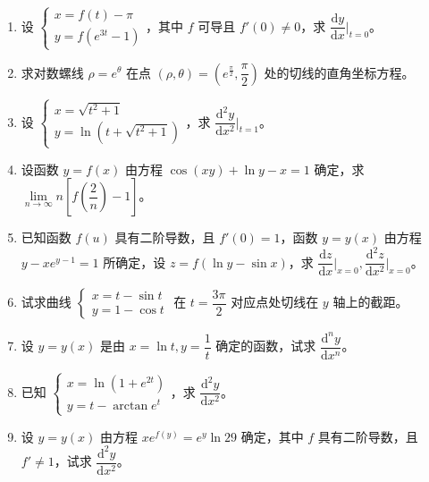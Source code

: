 \begin{enumerate}[label=\textbf{\arabic*.}, itemsep=5cm]
    \item 设 $\begin{cases} x = f(t) - \pi \\ y = f(e^{3t} - 1) \end{cases}$，其中 $f$ 可导且 $f'(0) \neq 0$，求 $\dfrac{\mathrm{d} y}{\mathrm{d} x} \bigg|_{t=0}$。

    \item 求对数螺线 $\rho = e^\theta$ 在点 $(\rho, \theta) = \left( e^{\frac{\pi}{2}}, \dfrac{\pi}{2} \right)$ 处的切线的直角坐标方程。

    \item 设 $\begin{cases} x = \sqrt{t^2 + 1} \\ y = \ln(t + \sqrt{t^2 + 1}) \end{cases}$，求 $\dfrac{\mathrm{d}^2 y}{\mathrm{d} x^2} \bigg|_{t=1}$。

    \item 设函数 $y = f(x)$ 由方程 $\cos(xy) + \ln y - x = 1$ 确定，求 $\lim\limits_{n \to \infty} n \left[ f\left( \dfrac{2}{n} \right) - 1 \right]$。

    \item 已知函数 $f(u)$ 具有二阶导数，且 $f'(0) = 1$，函数 $y = y(x)$ 由方程 $y - xe^{y-1} = 1$ 所确定，设 $z = f(\ln y - \sin x)$，求 $\dfrac{\mathrm{d} z}{\mathrm{d} x} \bigg|_{x=0}, \dfrac{\mathrm{d}^2 z}{\mathrm{d} x^2} \bigg|_{x=0}$。

    \item 试求曲线 $\begin{cases} x = t - \sin t \\ y = 1 - \cos t \end{cases}$ 在 $t = \dfrac{3\pi}{2}$ 对应点处切线在 $y$ 轴上的截距。

    \item 设 $y = y(x)$ 是由 $x = \ln t, y = \dfrac{1}{t}$ 确定的函数，试求 $\dfrac{\mathrm{d}^n y}{\mathrm{d} x^n}$。

    \item 已知 $\begin{cases} x = \ln(1 + e^{2t}) \\ y = t - \arctan e^t \end{cases}$，求 $\dfrac{\mathrm{d}^2 y}{\mathrm{d} x^2}$。

    \item 设 $y = y(x)$ 由方程 $xe^{f(y)} = e^y \ln 29$ 确定，其中 $f$ 具有二阶导数，且 $f' \neq 1$，试求 $\dfrac{\mathrm{d}^2 y}{\mathrm{d} x^2}$。


\end{enumerate}

